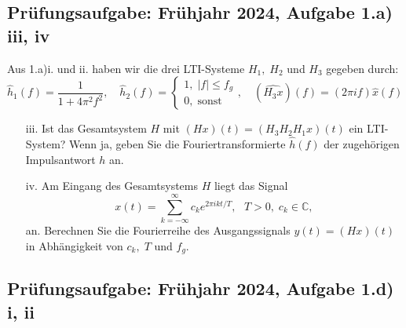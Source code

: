 \documentclass[11pt]{article}
\begin{document}
\subsection*{Prüfungsaufgabe: Frühjahr 2024, Aufgabe 1.a) iii, iv }
Aus 1.a)i. und ii. haben wir die drei LTI-Systeme $H_1, \; H_2$ und $H_3$ gegeben durch:
$$\hat{h}_1(f) = \frac{1}{1+4\pi^2 f^2}, \hspace{12pt} \hat{h}_2(f) = \begin{cases}
    1, \; |f| \leq f_g \\
    0, \; \text{sonst}
\end{cases}, \hspace{12pt} (\widehat{H_3 x})(f)=(2 \pi i f)\hat{x}(f)$$
\begin{itemize}
    \item[iii.] Ist das Gesamtsystem $H$ mit $(Hx)(t) = (H_3 H_2 H_1 x)(t)$ ein LTI-System? Wenn ja, geben Sie die Fouriertransformierte $\hat{h}(f)$ der zugehörigen Impulsantwort $h$ an.
    \item[iv.] Am Eingang des Gesamtsystems $H$ liegt das Signal
    $$x(t) = \sum_{k=-\infty}^\infty c_k e^{2 \pi i k t/T}, \hspace{8pt} T>0, \; c_k \in \mathbb{C},$$
    an. Berechnen Sie die Fourierreihe des Ausgangssignals $y(t) = (Hx)(t)$ in Abhängigkeit von $c_k, \; T$ und $f_g$.
\end{itemize}


\pagebreak

\subsection*{Prüfungsaufgabe: Frühjahr 2024, Aufgabe 1.d) i, ii}
\end{document}
